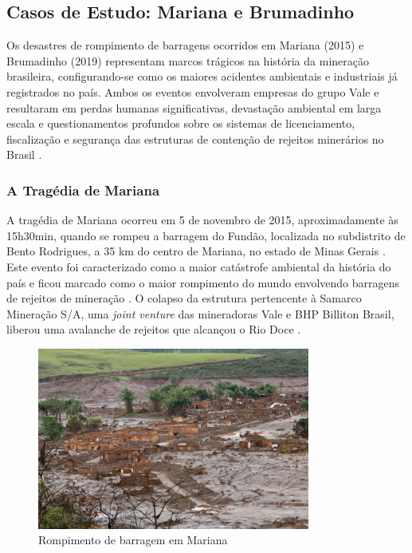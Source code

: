 \subsection{Casos de Estudo: Mariana e Brumadinho}

Os desastres de rompimento de barragens ocorridos em Mariana (2015) e Brumadinho (2019) representam marcos trágicos na história da mineração brasileira, configurando-se como os maiores acidentes ambientais e industriais já registrados no país. Ambos os eventos envolveram empresas do grupo Vale e resultaram em perdas humanas significativas, devastação ambiental em larga escala e questionamentos profundos sobre os sistemas de licenciamento, fiscalização e segurança das estruturas de contenção de rejeitos minerários no Brasil \cite{wikipedia2019brumadinho}.

\subsubsection{A Tragédia de Mariana}

A tragédia de Mariana ocorreu em 5 de novembro de 2015, aproximadamente às 15h30min, quando se rompeu a barragem do Fundão, localizada no subdistrito de Bento Rodrigues, a 35 km do centro de Mariana, no estado de Minas Gerais \cite{brasil2024timeline}. Este evento foi caracterizado como a maior catástrofe ambiental da história do país e ficou marcado como o maior rompimento do mundo envolvendo barragens de rejeitos de mineração \cite{brasil2024timeline}. O colapso da estrutura pertencente à Samarco Mineração S/A, uma \textit{joint venture} das mineradoras Vale e BHP Billiton Brasil, liberou uma avalanche de rejeitos que alcançou o Rio Doce \cite{brasil2024timeline}.

\begin{figure}[htbp]
    \centering
    \includegraphics[width=0.8\textwidth]{figures/image35_rompimento_mariana.jpg}
    \caption{Rompimento de barragem em Mariana}
    \label{fig:rompimento_mariana}
\end{figure}

